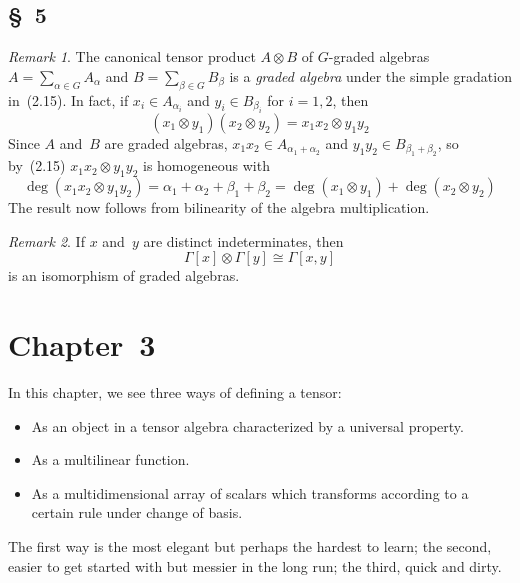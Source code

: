 \documentclass[letterpaper,12pt]{article}
\newcommand{\iso}{\cong}
\newcommand{\tprod}{\otimes}
\theoremstyle{definition}
\theoremstyle{remark}
\newtheorem*{rmk}{Remark}
\begin{document}
\subsection*{\S~5}
\begin{rmk}
The canonical tensor product \(A\tprod B\) of \(G\)-graded algebras \(A=\sum_{\alpha\in G}A_{\alpha}\) and \(B=\sum_{\beta\in G}B_{\beta}\) is a \emph{graded algebra} under the simple gradation in~(2.15). In fact, if \(x_i\in A_{\alpha_i}\) and \(y_i\in B_{\beta_i}\) for \(i=1,2\), then
\[(x_1\tprod y_1)(x_2\tprod y_2)=x_1x_2\tprod y_1y_2\]
Since \(A\) and~\(B\) are graded algebras, \(x_1x_2\in A_{\alpha_1+\alpha_2}\) and \(y_1y_2\in B_{\beta_1+\beta_2}\), so by~(2.15) \(x_1x_2\tprod y_1y_2\) is homogeneous with
\[\deg(x_1x_2\tprod y_1y_2)=\alpha_1+\alpha_2+\beta_1+\beta_2=\deg(x_1\tprod y_1)+\deg(x_2\tprod y_2)\]
The result now follows from bilinearity of the algebra multiplication.
\end{rmk}

\begin{rmk}
If \(x\) and~\(y\) are distinct indeterminates, then
\[\Gamma[x]\tprod\Gamma[y]\iso\Gamma[x,y]\]
is an isomorphism of graded algebras.
\end{rmk}

\section*{Chapter~3}
In this chapter, we see three ways of defining a tensor:
\begin{itemize}[itemsep=0pt]
\item As an object in a tensor algebra characterized by a universal property.
\item As a multilinear function.
\item As a multidimensional array of scalars which transforms according to a certain rule under change of basis.
\end{itemize}
The first way is the most elegant but perhaps the hardest to learn; the second, easier to get started with but messier in the long run; the third, quick and dirty.
\end{document}
